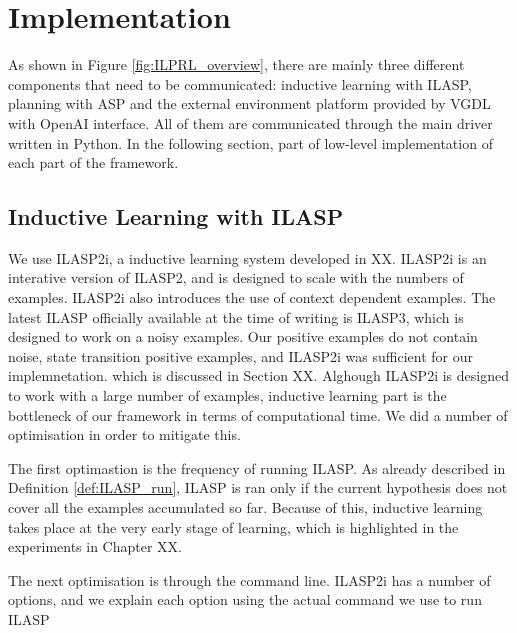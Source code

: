 \section{Implementation}
\label{Implementation}

As shown in Figure \ref{fig:ILPRL_overview}, there are mainly three different components that need to be communicated: inductive learning with ILASP, planning with ASP and the external environment platform provided by VGDL with OpenAI interface.
All of them are communicated through the main driver written in Python. 
In the following section, part of low-level implementation of each part of the framework.


\subsection{Inductive Learning with ILASP}
We use ILASP2i, a inductive learning system developed in XX. 
ILASP2i is an interative version of ILASP2, and is designed to scale with the numbers of examples. 
ILASP2i also introduces the use of context dependent examples.
The latest ILASP officially available at the time of writing is ILASP3, which is designed to work on a noisy examples. 
Our positive examples do not contain noise, state transition positive examples, and ILASP2i was sufficient for our implemnetation.
which is discussed in Section XX. 
Alghough ILASP2i is designed to work with a large number of examples, inductive learning part is the bottleneck of our framework in terms of computational time. 
We did a number of optimisation in order to mitigate this. 

The first optimastion is the frequency of running ILASP. 
As already described in Definition \ref{def:ILASP_run}, ILASP is ran only if the current hypothesis does not cover all the examples accumulated so far.
Because of this, inductive learning takes place at the very early stage of learning, which is highlighted in the experiments in Chapter XX. 

The next optimisation is through the command line. 
ILASP2i has a number of options, and we explain each option using the actual command we use to run ILASP


